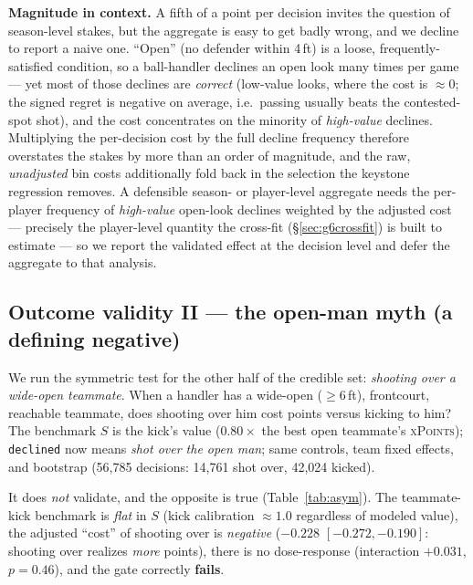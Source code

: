 \documentclass[11pt]{article}
\newcommand{\xpts}{\textsc{xPoints}}
\begin{document}
\textbf{Magnitude in context.} A fifth of a point per decision invites the question of season-level
stakes, but the aggregate is easy to get badly wrong, and we decline to report a naive one. ``Open''
(no defender within 4\,ft) is a loose, frequently-satisfied condition, so a ball-handler declines an
open look many times per game --- yet most of those declines are \emph{correct} (low-value looks, where
the cost is $\approx\!0$; the signed regret is negative on average, i.e.\ passing usually beats the
contested-spot shot), and the cost concentrates on the minority of \emph{high-value} declines.
Multiplying the per-decision cost by the full decline frequency therefore overstates the stakes by more
than an order of magnitude, and the raw, \emph{unadjusted} bin costs additionally fold back in the
selection the keystone regression removes. A defensible season- or player-level aggregate needs the
per-player frequency of \emph{high-value} open-look declines weighted by the adjusted cost --- precisely
the player-level quantity the cross-fit (\S\ref{sec:g6crossfit}) is built to estimate --- so we report
the validated effect at the decision level and defer the aggregate to that analysis.

\subsection{Outcome validity II --- the open-man myth (a defining negative)}\label{sec:g6asym}
We run the symmetric test for the other half of the credible set: \emph{shooting over a wide-open
teammate}. When a handler has a wide-open ($\ge$6\,ft), frontcourt, reachable teammate, does shooting
over him cost points versus kicking to him? The benchmark $S$ is the kick's value ($0.80\times$ the best
open teammate's \xpts{}); \texttt{declined} now means \emph{shot over the open man}; same controls, team
fixed effects, and bootstrap (56{,}785 decisions: 14{,}761 shot over, 42{,}024 kicked).

It does \emph{not} validate, and the opposite is true (Table~\ref{tab:asym}). The teammate-kick benchmark
is \emph{flat} in $S$ (kick calibration $\approx\!1.0$ regardless of modeled value), the adjusted ``cost''
of shooting over is \emph{negative} ($-0.228$ $[-0.272,-0.190]$: shooting over realizes \emph{more} points),
there is no dose-response (interaction $+0.031$, $p=0.46$), and the gate correctly \textbf{fails}.
\end{document}
